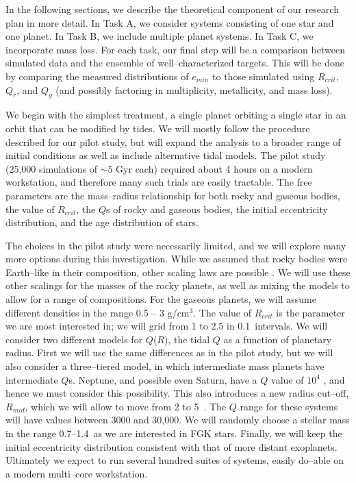 \medskip
{\centerline{}}
\smallskip

In the following sections, we describe the theoretical component of
our research plan in more detail.  In Task A, we consider systems
consisting of one star and one planet.  In Task B, we include multiple
planet systems. In Task C, we incorporate mass loss.  For each task,
our final step will be a comparison between simulated data and the
ensemble of well--characterized \kepler targets.  This will be done by
comparing the measured distributions of $e_{min}$ to those simulated
using $R_{crit}$, $Q_r$, and $Q_g$ (and possibly factoring in
multiplicity, metallicity, and mass loss).

\medskip
{\centerline{}}
\smallskip

We begin with the simplest treatment, a single planet orbiting a
single star in an orbit that can be modified by tides.  We will mostly
follow the procedure described for our pilot study, but will expand
the analysis to a broader range of initial conditions as well as
include alternative tidal models.  The pilot study (25,000 simulations
of $\sim 5$ Gyr each) required about 4 hours on a modern workstation,
and therefore many such trials are easily tractable.  The free parameters are the mass--radius
relationship for both rocky and gaseous bodies, the value of
$R_{crit}$, the $Q$s of rocky and gaseous bodies, the initial
eccentricity distribution, and the age distribution of \kepler stars.

The choices in the pilot study were necessarily limited, and we will
explore many more options during this investigation.  While we assumed that
rocky bodies were Earth--like in their composition, other scaling laws
are possible \citep[e.g.][]{Seager07,Fortney07,Lissauer11}.  We will
use these other scalings for the masses of the rocky planets, as well
as mixing the models to allow for a range of compositions.  For the
gaseous planets, we will assume different densities in the range 0.5
-- 3 g/cm$^3$.  The value of $R_{crit}$ is the parameter we are most
interested in; we will grid from 1 to 2.5
\rearth in 0.1~\rearth intervals.  We will consider two different
models for $Q$($R$), the tidal $Q$ as a function of planetary radius.
First we will use the same differences as in the pilot study, but we
will also consider a three--tiered model, in which intermediate mass
planets have intermediate $Q$s.  Neptune, and possible even Saturn,
have a $Q$ value of $10^4$ \citep{ZhangHamilton08,Lainey12}, and hence
we must consider this possibility.  This also introduces a new
radius cut--off, $R_{mid}$, which we will allow to move from 2 to
5~\rearth.  The $Q$ range for these systems will have values between
3000 and 30,000.  We will randomly choose a stellar mass in the range
0.7--1.4~\msun as we are interested in FGK stars.  Finally, we will
keep the initial eccentricity distribution consistent with that of
more distant exoplanets.  Ultimately we expect to run several hundred
suites of systems, easily do--able on a modern multi--core
workstation.

